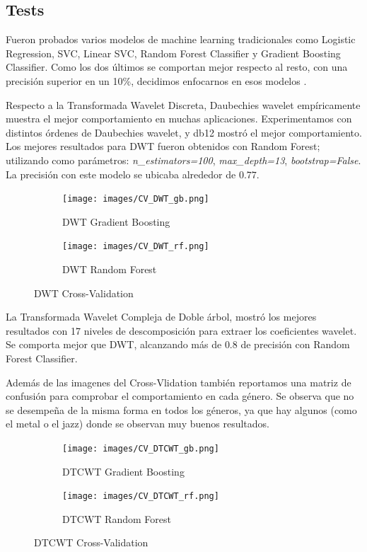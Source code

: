 \documentclass[colorinlistoftodos,twoside,twocolumn,10pt]{article} %
\begin{document}
	\subsection{Tests}

  Fueron probados varios modelos de machine learning tradicionales como Logistic Regression, SVC, Linear SVC, Random Forest Classifier y Gradient Boosting Classifier. Como los dos \'ultimos se comportan mejor respecto al resto, con una precisi\'on superior en un 10\%, decidimos enfocarnos en esos modelos . 

Respecto a la Transformada Wavelet Discreta, Daubechies wavelet  emp\'iricamente muestra el mejor comportamiento en muchas aplicaciones\cite{Wavelet Transform for Music Genre Classification}. Experimentamos con distintos \'ordenes de Daubechies wavelet, y db12 mostr\'o el mejor comportamiento. Los mejores resultados para DWT fueron obtenidos con Random Forest; utilizando como par\'ametros: \emph{n\_estimators=100}, \emph{max\_depth=13}, \emph{bootstrap=False}. La precisi\'on con este modelo se ubicaba alrededor de $0.77$. \\

	\begin{figure}[h!] %
		\centering
		\begin{subfigure}{0.45\linewidth} %
			\texttt{[image: images/CV\_DWT\_gb.png]}
			\caption{DWT Gradient Boosting}
		\end{subfigure}
		\begin{subfigure}{0.45\linewidth} %
			\texttt{[image: images/CV\_DWT\_rf.png]}
			\caption{DWT Random Forest}
		\end{subfigure}
		\caption{DWT Cross-Validation}
	\end{figure}

La Transformada Wavelet Compleja de Doble \'arbol, mostr\'o los mejores resultados con 17 niveles de descomposici\'on para extraer los coeficientes wavelet. Se comporta mejor que DWT, alcanzando m\'as de $0.8$ de precisi\'on con Random Forest Classifier.  

Adem\'as de las imagenes del Cross-Vlidation tambi\'en reportamos una matriz de confusi\'on para comprobar el comportamiento en cada g\'enero. Se observa que no se desempe\~na de la misma forma en todos los g\'eneros, ya que hay algunos (como el metal o el jazz) donde se observan muy buenos resultados. \\

	\begin{figure}[h!] %
		\centering
		\begin{subfigure}{0.45\linewidth} %
			\texttt{[image: images/CV\_DTCWT\_gb.png]}                   
			\caption{DTCWT Gradient Boosting}
		\end{subfigure}
		\begin{subfigure}{0.45\linewidth} %
			\texttt{[image: images/CV\_DTCWT\_rf.png]}                  
			\caption{DTCWT Random Forest}
		\end{subfigure}
		\caption{DTCWT Cross-Validation}
	\end{figure}
\end{document}
